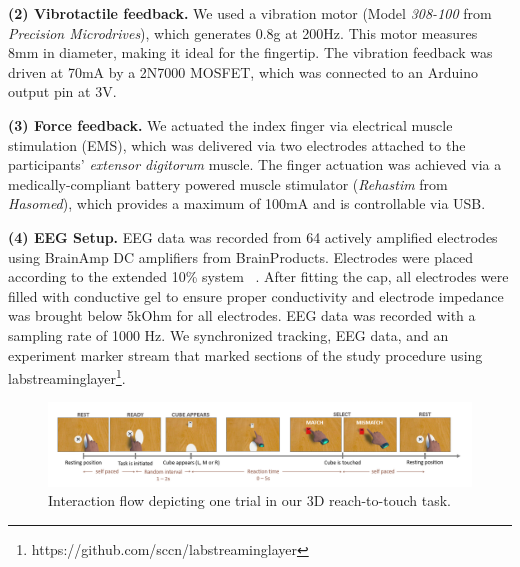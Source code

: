 \textbf{(2) Vibrotactile feedback.} We used a vibration motor (Model \textit{308-100} from \textit{Precision Microdrives}), which generates 0.8g at 200Hz. This motor measures 8mm in diameter, making it ideal for the fingertip. The vibration feedback was driven at 70mA by a 2N7000 MOSFET, which was connected to an Arduino output pin at 3V.

\textbf{(3) Force feedback.} We actuated the index finger via electrical muscle stimulation (EMS), which was delivered via two electrodes attached to the participants' \textit{extensor digitorum} muscle. The finger actuation was achieved via a medically-compliant battery powered muscle stimulator (\textit{Rehastim} from \textit{Hasomed}), which provides a maximum of 100mA and is controllable via USB. 


\textbf{(4) EEG Setup.} EEG data was recorded from 64 actively amplified electrodes using BrainAmp DC amplifiers from BrainProducts. Electrodes were placed according to the extended 10\% system ~\cite{oostenveld_five_2001}. After fitting the cap, all electrodes were filled with conductive gel to ensure proper conductivity and electrode impedance was brought below 5kOhm for all electrodes. EEG data was recorded with a sampling rate of 1000 Hz. We synchronized tracking, EEG data, and an experiment marker stream that marked sections of the study procedure using labstreaminglayer\footnote{https://github.com/sccn/labstreaminglayer}.

\begin{figure}[!ht]
\includegraphics[width=\linewidth]{figures/Task_mismatch.PNG}
\vspace{-15pt}
\caption{Interaction flow depicting one trial in our 3D reach-to-touch task.}
\label{task_flow}
\end{figure}

